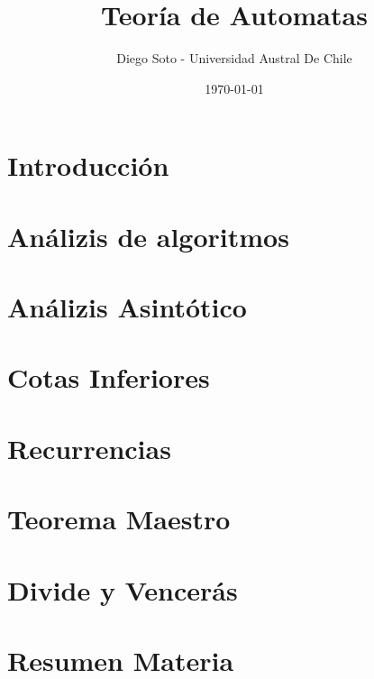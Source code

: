 \documentclass[12pt]{article}
\begin{document}
\title{Teoría de Automatas}
\author{Diego Soto - Universidad Austral De Chile}
\date{\today}
\maketitle

\newpage %
\tableofcontents
\newpage

\section{Introducción}

\section{Análizis de algoritmos}
\section{Análizis Asintótico}
\section{Cotas Inferiores}
\section{Recurrencias}
\section{Teorema Maestro}
\section{Divide y Vencerás}

\newpage
\section{Resumen Materia}
\end{document}
